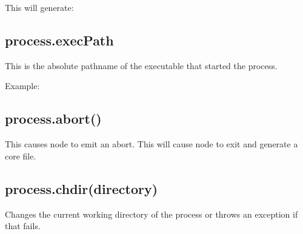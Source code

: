 This will generate:

\begin{Shaded}
\begin{Highlighting}[]
\NormalTok{: }\OtherTok{/}\OtherTok{/}
\end{Highlighting}
\end{Shaded}

\subsection{process.execPath}

This is the absolute pathname of the executable that started the
process.

Example:

\begin{Shaded}
\begin{Highlighting}[]
\end{Highlighting}
\end{Shaded}

\subsection{process.abort()}

This causes node to emit an abort. This will cause node to exit and
generate a core file.

\subsection{process.chdir(directory)}

Changes the current working directory of the process or throws an
exception if that fails.

\begin{Shaded}
\begin{Highlighting}[]
\NormalTok{(} \NormalTok{+ }\NormalTok{());}
 \NormalTok{\{}
  \NormalTok{(}\NormalTok{);}
  \NormalTok{(} \NormalTok{+ }\NormalTok{());}
\NormalTok{\}}
 
  \NormalTok{(} 
\NormalTok{\}}
\end{Highlighting}
\end{Shaded}

